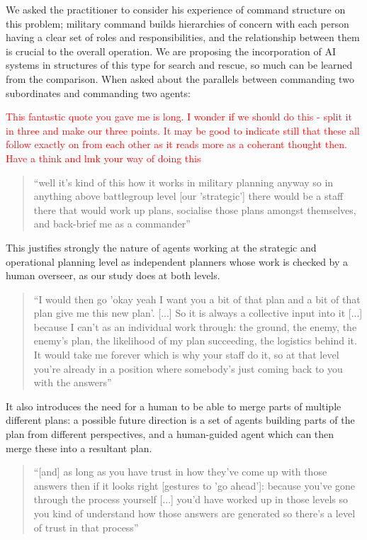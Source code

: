 We asked the practitioner to consider his experience of command structure on this problem; military command builds hierarchies of concern with each person having a clear set of roles and responsibilities, and the relationship between them is crucial to the overall operation. We are proposing the incorporation of AI systems in structures of this type for search and rescue, so much can be learned from the comparison. When asked about the parallels between commanding two subordinates and commanding two agents:

\textcolor{red}{This fantastic quote you gave me is long. I wonder if we should do this - split it in three and make our three points. It may be good to indicate still that these all follow exactly on from each other as it reads more as a coherant thought then. Have a think and lmk your way of doing this}

\begin{quote}\small
``well it's kind of this how it works in military planning anyway so in anything above battlegroup level [our 'strategic'] there would be a staff there that would work up plans, socialise those plans amongst themselves, and back-brief me as a commander''
\end{quote}

This justifies strongly the nature of agents working at the strategic and operational planning level as independent planners whose work is checked by a human overseer, as our study does at both levels. 

\begin{quote}\small
``I would then go 'okay yeah I want you a bit of that plan and a bit of that plan give me this new plan'. [...] So it is always a collective input into it [...] because I can't as an individual work through: the ground, the enemy, the enemy's plan, the likelihood of my plan succeeding, the logistics behind it. It would take me forever which is why your staff do it, so at that level you're already in a position where somebody's just coming back to you with the answers''
\end{quote}

It also introduces the need for a human to be able to merge parts of multiple different plans: a possible future direction is a set of agents building parts of the plan from different perspectives, and a human-guided agent which can then merge these into a resultant plan.

\begin{quote}\small
``[and] as long as you have trust in how they've come up with those answers then if it looks right [gestures to 'go ahead']: because you've gone through the process yourself [...] you'd have worked up in those levels so you kind of understand how those answers are generated so there's a level of trust in that process''
\end{quote}


